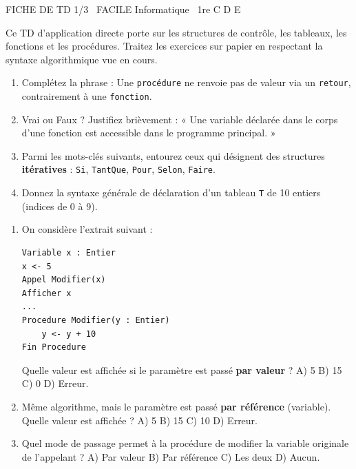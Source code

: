 \documentclass[11pt]{article}
\begin{document}
\begin{tcolorbox}[enhanced,colback=popink,colframe=popink,arc=10pt,boxrule=0pt,left=12pt,right=12pt,top=9pt,bottom=9pt]
{\color{white}\popxbold\small FICHE DE TD 1/3 \textbullet\ FACILE \hfill Informatique \textbullet\ 1re C D E\par}
\end{tcolorbox}
\vspace{4pt}
Ce TD d'application directe porte sur les structures de contrôle, les tableaux, les fonctions et les procédures. Traitez les exercices sur papier en respectant la syntaxe algorithmique vue en cours.

\begin{exercice}
\begin{enumerate}
    \item Complétez la phrase : Une \texttt{procédure} ne renvoie pas de valeur via un \texttt{retour}, contrairement à une \texttt{fonction}.
    \item Vrai ou Faux ? Justifiez brièvement : « Une variable déclarée dans le corps d'une fonction est accessible dans le programme principal. »
    \item Parmi les mots-clés suivants, entourez ceux qui désignent des structures \textbf{itératives} : \texttt{Si}, \texttt{TantQue}, \texttt{Pour}, \texttt{Selon}, \texttt{Faire}.
    \item Donnez la syntaxe générale de déclaration d'un tableau \texttt{T} de 10 entiers (indices de 0 à 9).
\end{enumerate}
\end{exercice}

\begin{exercice}
\begin{enumerate}
    \item On considère l'extrait suivant :
\begin{verbatim}
Variable x : Entier
x <- 5
Appel Modifier(x)
Afficher x
...
Procedure Modifier(y : Entier)
    y <- y + 10
Fin Procedure
\end{verbatim}
Quelle valeur est affichée si le paramètre est passé \textbf{par valeur} ? \quad A) 5 \quad B) 15 \quad C) 0 \quad D) Erreur.
    \item Même algorithme, mais le paramètre est passé \textbf{par référence} (variable). Quelle valeur est affichée ? \quad A) 5 \quad B) 15 \quad C) 10 \quad D) Erreur.
    \item Quel mode de passage permet à la procédure de modifier la variable originale de l'appelant ? \quad A) Par valeur \quad B) Par référence \quad C) Les deux \quad D) Aucun.
\end{enumerate}
\end{exercice}
\end{document}
